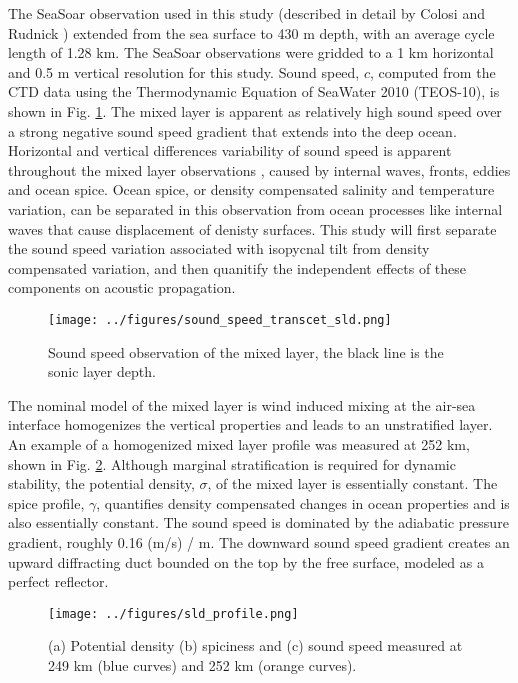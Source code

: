 \documentclass[preprint,NumberedRefs]{JASA}
\begin{document}
The SeaSoar observation used in this study (described in detail by Colosi and Rudnick \citep{colosi2020observations}) extended from the sea surface to 430 m depth, with an average cycle length of 1.28 km. The SeaSoar observations were gridded to a 1 km horizontal and 0.5 m vertical resolution for this study. Sound speed, $c$, computed from the CTD data using the Thermodynamic Equation of SeaWater 2010 (TEOS-10), is shown in Fig. \ref{fig:c_grid}. The mixed layer is apparent as relatively high sound speed over a strong negative sound speed gradient that extends into the deep ocean. Horizontal and vertical differences variability of sound speed is apparent throughout the mixed layer observations \citep{colosi2020observations}, caused by internal waves, fronts, eddies and ocean spice. Ocean spice, or density compensated salinity and temperature variation, can be separated in this observation from ocean processes like internal waves that cause displacement of denisty surfaces\citep{dzieciuch2004}. This study will first separate the sound speed variation associated with isopycnal tilt from density compensated variation, and then quanitify the independent effects of these components on acoustic propagation.

\begin{figure}
\texttt{[image: ../figures/sound\_speed\_transcet\_sld.png]}
\caption{\label{fig:c_grid}{Sound speed observation of the mixed layer, the black line is the sonic layer depth.}}
\end{figure}

The nominal model of the mixed layer is wind induced mixing at the air-sea interface homogenizes the vertical properties and leads to an unstratified layer. An example of a homogenized mixed layer profile was measured at 252 km, shown in Fig. \ref{fig:profiles}. Although marginal stratification is required for dynamic stability, the potential density, $\sigma$, of the mixed layer is essentially constant. The spice profile, $\gamma$, quantifies density compensated changes in ocean properties and is also essentially constant. The sound speed is dominated by the adiabatic pressure gradient, roughly 0.16 (m/s) / m. The downward sound speed gradient creates an upward diffracting duct bounded on the top by the free surface, modeled as a perfect reflector.

\begin{figure}
\texttt{[image: ../figures/sld\_profile.png]}
    \caption{\label{fig:profiles}{(a) Potential density (b) spiciness and (c) sound speed measured at 249 km (blue curves) and 252 km (orange curves).}}
\end{figure}
\end{document}
